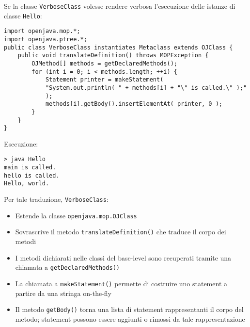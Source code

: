 Se la classe \texttt{VerboseClass} volesse rendere verbosa l'esecuzione delle istanze di classe \texttt{Hello}:
\begin{verbatim}
import openjava.mop.*;
import openjava.ptree.*;
public class VerboseClass instantiates Metaclass extends OJClass {
    public void translateDefinition() throws MOPException {
        OJMethod[] methods = getDeclaredMethods();
        for (int i = 0; i < methods.length; ++i) {
            Statement printer = makeStatement(
            "System.out.println( " + methods[i] + "\" is called.\" );"
            );
            methods[i].getBody().insertElementAt( printer, 0 );
        }
    }
}
\end{verbatim}

Esecuzione:
\begin{verbatim}
> java Hello
main is called.
hello is called.
Hello, world.
\end{verbatim}

Per tale traduzione, \texttt{VerboseClass}:
\begin{itemize}
    \item Estende la classe \texttt{openjava.mop.OJClass}

    \item Sovrascrive il metodo \texttt{translateDefinition()} che traduce il corpo dei metodi

    \item I metodi dichiarati nelle classi del base-level sono recuperati tramite una chiamata a \texttt{getDeclaredMethods()}

    \item La chiamata a \texttt{makeStatement()} permette di costruire uno statement a partire da una stringa on-the-fly

    \item Il metodo \texttt{getBody()} torna una lista di statement rappresentanti il corpo del metodo; statement possono essere aggiunti o rimossi da tale rappresentazione
\end{itemize}